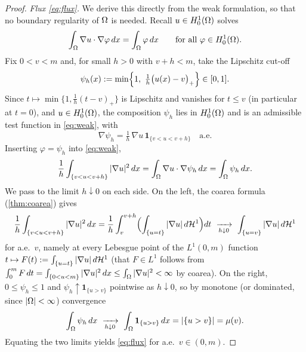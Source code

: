 \begin{proof}
\emph{Flux \eqref{eq:flux}.} We derive this directly from the weak
formulation, so that no boundary regularity of $\Omega$ is needed. Recall
$u\in H^1_0(\Omega)$ solves
\begin{equation}\label{eq:weak}
   \int_\Omega\nabla u\cdot\nabla\varphi\,dx=\int_\Omega\varphi\,dx
   \qquad\text{for all }\varphi\in H^1_0(\Omega).
\end{equation}
Fix $0<v<m$ and, for small $h>0$ with $v+h<m$, take the Lipschitz cut-off
\[
   \psi_h(x):=\min\Bigl\{1,\ \tfrac1h\bigl(u(x)-v\bigr)_+\Bigr\}\in[0,1].
\]
Since $t\mapsto\min\{1,\tfrac1h(t-v)_+\}$ is Lipschitz and vanishes for
$t\le v$ (in particular at $t=0$), and $u\in H^1_0(\Omega)$, the composition
$\psi_h$ lies in $H^1_0(\Omega)$ and is an admissible test function in
\eqref{eq:weak}, with
\[
   \nabla\psi_h=\tfrac1h\,\nabla u\,\mathbf 1_{\{v<u<v+h\}}\quad\text{a.e.}
\]
Inserting $\varphi=\psi_h$ into \eqref{eq:weak},
\[
   \frac1h\int_{\{v<u<v+h\}}|\nabla u|^2\,dx
   =\int_\Omega\nabla u\cdot\nabla\psi_h\,dx
   =\int_\Omega\psi_h\,dx .
\]
We pass to the limit $h\downarrow0$ on each side. On the left, the coarea
formula (\cref{thm:coarea}) gives
\[
   \frac1h\int_{\{v<u<v+h\}}|\nabla u|^2\,dx
   =\frac1h\int_v^{v+h}\Bigl(\int_{\{u=t\}}|\nabla u|\,d\mathcal{H}^1\Bigr)dt
   \ \xrightarrow[h\downarrow0]{}\ \int_{\{u=v\}}|\nabla u|\,d\mathcal{H}^1
\]
for a.e.\ $v$, namely at every Lebesgue point of the $L^1(0,m)$ function
$t\mapsto F(t):=\int_{\{u=t\}}|\nabla u|\,d\mathcal{H}^1$ (that $F\in L^1$ follows from
$\int_0^m F\,dt=\int_{\{0<u<m\}}|\nabla u|^2\,dx\le\int_\Omega|\nabla u|^2<\infty$
by coarea). On the right, $0\le\psi_h\le1$ and $\psi_h\uparrow\mathbf
1_{\{u>v\}}$ pointwise as $h\downarrow0$, so by monotone (or dominated, since
$|\Omega|<\infty$) convergence
\[
   \int_\Om\psi_h\,dx\ \xrightarrow[h\downarrow0]{}\ \int_\Om\mathbf
   1_{\{u>v\}}\,dx=|\{u>v\}|=\mu(v).
\]
Equating the two limits yields \eqref{eq:flux} for a.e.\ $v\in(0,m)$.


\end{proof}
